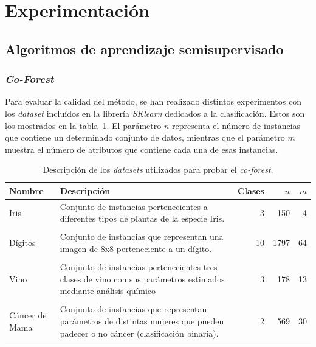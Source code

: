 


\section{Experimentación}

\subsection{Algoritmos de aprendizaje semisupervisado}

\subsubsection{\textit{Co-Forest}}

Para evaluar la calidad del método, se han realizado distintos experimentos con los \textit{dataset} incluídos en la librería \textit{SKlearn} dedicados a la clasificación. Estos son los mostrados en la tabla~\ref{tabla_datasets_sklearn}. El parámetro $n$ representa el número de instancias que contiene un determinado conjunto de datos, mientras que el parámetro $m$ muestra el número de atributos que contiene cada una de esas instancias.

\begin{table}
	\small
	\begin{centering}
		
		\begin{tabular}{@{}p{4em} p{20em} r r r @{}}
			\toprule
			\textbf{Nombre} & \textbf{Descripción} & \textbf{Clases} & $n$ & $m$\\ 
			\midrule
			
			Iris & Conjunto de instancias pertenecientes a diferentes tipos de plantas de la especie Iris. & 3 & 150 & 4 \\\\
			Dígitos & Conjunto de instancias que representan una imagen de 8x8 perteneciente a un dígito. & 10 & 1797 & 64 \\\\
			Vino & Conjunto de instancias pertenecientes tres clases de vino con sus parámetros estimados mediante análisis químico & 3 & 178 & 13 \\\\
			Cáncer de Mama & Conjunto de instancias que representan parámetros de distintas mujeres que pueden padecer o no cáncer (clasificación binaria). & 2 & 569 & 30 \\
		\end{tabular}
		
	\end{centering}
	\caption{Descripción de los \textit{datasets} utilizados para probar el \textit{co-forest}.}
	\label{tabla_datasets_sklearn}	
\end{table}


